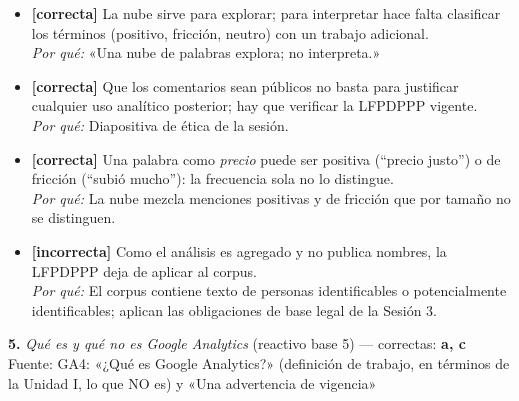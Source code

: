 \documentclass[10pt,letterpaper]{article}
\begin{document}
\begin{itemize}[leftmargin=1.2em,itemsep=0pt,topsep=1pt,parsep=0pt]
\item[\textbf{a)}] {\footnotesize \textbf{[correcta]} La nube sirve para explorar; para interpretar hace falta clasificar los términos (positivo, fricción, neutro) con un trabajo adicional.\\ \textit{Por qué:} «Una nube de palabras explora; no interpreta.»}
\item[\textbf{b)}] {\footnotesize \textbf{[correcta]} Que los comentarios sean públicos no basta para justificar cualquier uso analítico posterior; hay que verificar la LFPDPPP vigente.\\ \textit{Por qué:} Diapositiva de ética de la sesión.}
\item[\textbf{c)}] {\footnotesize \textbf{[correcta]} Una palabra como \textit{precio} puede ser positiva (\enquote{precio justo}) o de fricción (\enquote{subió mucho}): la frecuencia sola no lo distingue.\\ \textit{Por qué:} La nube mezcla menciones positivas y de fricción que por tamaño no se distinguen.}
\item[\textbf{d)}] {\footnotesize \textbf{[incorrecta]} Como el análisis es agregado y no publica nombres, la LFPDPPP deja de aplicar al corpus.\\ \textit{Por qué:} El corpus contiene texto de personas identificables o potencialmente identificables; aplican las obligaciones de base legal de la Sesión 3.}
\end{itemize}
\vspace{3pt}\noindent\textbf{5.} \textit{Qué es y qué no es Google Analytics} (reactivo base 5) — correctas: \textbf{a, c}\\[-1pt]
{\scriptsize Fuente: GA4: «¿Qué es Google Analytics?» (definición de trabajo, en términos de la Unidad I, lo que NO es) y «Una advertencia de vigencia»}
\end{document}
